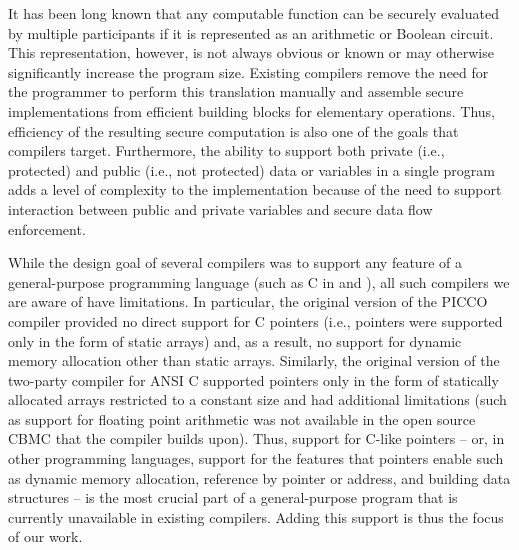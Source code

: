 \documentclass[11pt]{article}
\begin{document}
It has been long known that any computable function can be securely
evaluated by multiple participants if it is represented as an arithmetic or
Boolean circuit. This representation, however, is not always obvious or
known or may otherwise significantly increase the program size. Existing
compilers remove the need for the programmer to perform this translation
manually and assemble secure implementations from efficient building blocks
for elementary operations. Thus, efficiency of the resulting secure
computation is also one of the goals that compilers target. Furthermore, the
ability to support both private (i.e., protected) and public (i.e., not
protected) data or variables in a single program adds a level of complexity
to the implementation because of the need to support interaction between
public and private variables and secure data flow enforcement.

While the design goal of several compilers was to support any feature
of a general-purpose programming language (such as C in \cite{hol12} and
\cite{zha13}), all such compilers we are aware of have limitations. In
particular, the original version of the PICCO compiler \cite{zha13} provided
no direct support for C pointers (i.e., pointers were supported only in the
form of static arrays) and, as a result, no support for dynamic memory
allocation other than static arrays. Similarly, the original 
version of the two-party compiler for ANSI C \cite{hol12} supported pointers
only in the form of statically allocated arrays restricted to a constant size
and had additional limitations (such as support for floating point
arithmetic was not available in the open source CBMC that the compiler
builds upon). Thus, support for C-like pointers -- or, in other programming
languages, support for the features that pointers enable such as dynamic
memory allocation, reference by pointer or address, and building data
structures -- is the most crucial part of a general-purpose program that is
currently unavailable in existing compilers. Adding this support is thus the
focus of our work.
\end{document}
